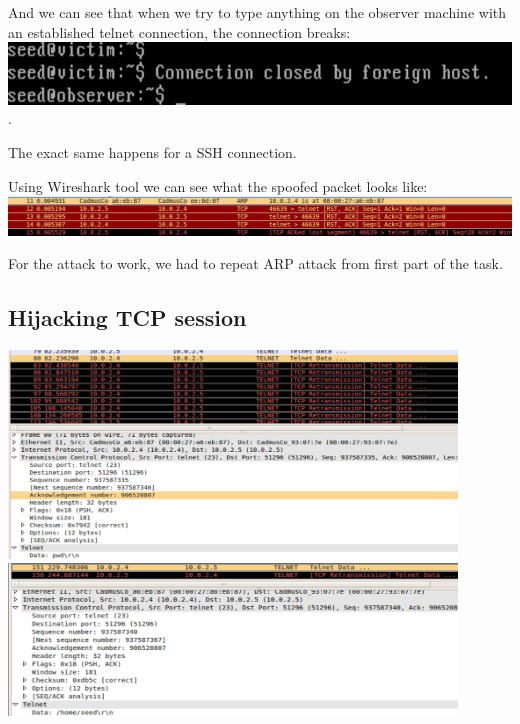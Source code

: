 \documentclass[12pt, a4paper, pdflatex]{article}
\begin{document}
And we can see that when we try to type anything on the observer machine with an established telnet connection, the connection breaks:\\
\includegraphics[width=.95\textwidth]{gfx/rst-reset.png}.

The exact same happens for a SSH connection.

Using Wireshark tool we can see what the spoofed packet looks like:\\
\includegraphics[width=.95\textwidth]{gfx/rst-spoofed.png}

For the attack to work, we had to repeat ARP attack from first part of the task.


\subsection{Hijacking TCP session}

\includegraphics[width=450px]{gfx/request.png}\\
\includegraphics[width=450px]{gfx/response.png}
\end{document}
